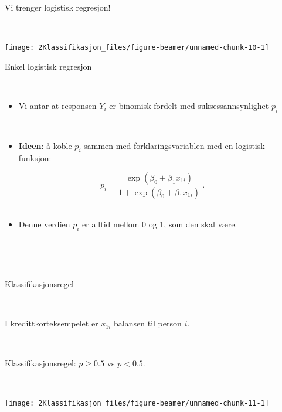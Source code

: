 \documentclass[10pt,ignorenonframetext,]{beamer}
\providecommand{\tightlist}{%
  \setlength{\itemsep}{0pt}\setlength{\parskip}{0pt}}
\begin{document}
\begin{frame}

\begin{block}{Vi trenger logistisk regresjon!}

\(~\)

\begin{center}\texttt{[image: 2Klassifikasjon\_files/figure-beamer/unnamed-chunk-10-1]} \end{center}

\end{block}

\end{frame}

\begin{frame}

\begin{block}{Enkel logistisk regresjon}

\(~\)

\begin{itemize}
\tightlist
\item
  Vi antar at responsen \(Y_i\) er binomisk fordelt med
  suksessannsynlighet \(p_i\)
\end{itemize}

\(~\)

\begin{itemize}
\tightlist
\item
  \textbf{Ideen}: å koble \(p_i\) sammen med forklaringsvariablen med en
  logistisk funksjon:
\end{itemize}

\[p_i = \frac{\exp(\beta_0 + \beta_1 x_{1i})}{1+ \exp(\beta_0 + \beta_1 x_{1i})} \ .\]
\(~\)

\begin{itemize}
\tightlist
\item
  Denne verdien \(p_i\) er alltid mellom 0 og 1, som den skal være.
\end{itemize}

\vspace{2mm}

\(~\)

\(~\)

\end{block}

\end{frame}

\begin{frame}

\begin{block}{Klassifikasjonsregel}

\(~\)

I kredittkorteksempelet er \(x_{1i}\) balansen til person \(i\).

\(~\)

Klassifikasjonsregel: \(p\geq 0.5\) vs \(p<0.5\).

\(~\)

\begin{center}\texttt{[image: 2Klassifikasjon\_files/figure-beamer/unnamed-chunk-11-1]} \end{center}

\end{block}

\end{frame}
\end{document}

